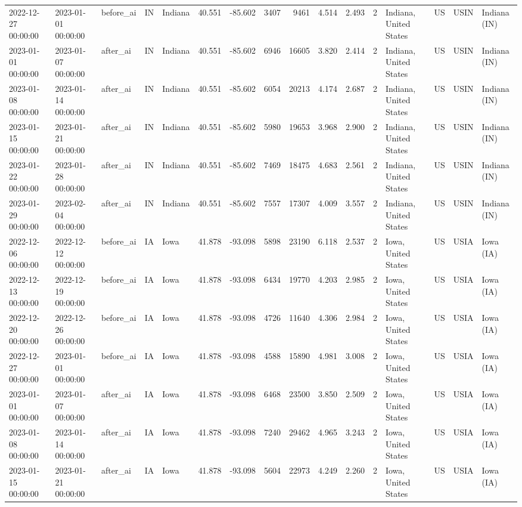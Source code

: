 \begin{tabular}{lllllrrrrrrlllll}
2022-12-27 00:00:00 & 2023-01-01 00:00:00 & before\_ai & IN & Indiana & 40.551 & -85.602 & 3407 & 9461 & 4.514 & 2.493 & 2 & Indiana, United States & US & USIN & Indiana (IN) \\
2023-01-01 00:00:00 & 2023-01-07 00:00:00 & after\_ai & IN & Indiana & 40.551 & -85.602 & 6946 & 16605 & 3.820 & 2.414 & 2 & Indiana, United States & US & USIN & Indiana (IN) \\
2023-01-08 00:00:00 & 2023-01-14 00:00:00 & after\_ai & IN & Indiana & 40.551 & -85.602 & 6054 & 20213 & 4.174 & 2.687 & 2 & Indiana, United States & US & USIN & Indiana (IN) \\
2023-01-15 00:00:00 & 2023-01-21 00:00:00 & after\_ai & IN & Indiana & 40.551 & -85.602 & 5980 & 19653 & 3.968 & 2.900 & 2 & Indiana, United States & US & USIN & Indiana (IN) \\
2023-01-22 00:00:00 & 2023-01-28 00:00:00 & after\_ai & IN & Indiana & 40.551 & -85.602 & 7469 & 18475 & 4.683 & 2.561 & 2 & Indiana, United States & US & USIN & Indiana (IN) \\
2023-01-29 00:00:00 & 2023-02-04 00:00:00 & after\_ai & IN & Indiana & 40.551 & -85.602 & 7557 & 17307 & 4.009 & 3.557 & 2 & Indiana, United States & US & USIN & Indiana (IN) \\
2022-12-06 00:00:00 & 2022-12-12 00:00:00 & before\_ai & IA & Iowa & 41.878 & -93.098 & 5898 & 23190 & 6.118 & 2.537 & 2 & Iowa, United States & US & USIA & Iowa (IA) \\
2022-12-13 00:00:00 & 2022-12-19 00:00:00 & before\_ai & IA & Iowa & 41.878 & -93.098 & 6434 & 19770 & 4.203 & 2.985 & 2 & Iowa, United States & US & USIA & Iowa (IA) \\
2022-12-20 00:00:00 & 2022-12-26 00:00:00 & before\_ai & IA & Iowa & 41.878 & -93.098 & 4726 & 11640 & 4.306 & 2.984 & 2 & Iowa, United States & US & USIA & Iowa (IA) \\
2022-12-27 00:00:00 & 2023-01-01 00:00:00 & before\_ai & IA & Iowa & 41.878 & -93.098 & 4588 & 15890 & 4.981 & 3.008 & 2 & Iowa, United States & US & USIA & Iowa (IA) \\
2023-01-01 00:00:00 & 2023-01-07 00:00:00 & after\_ai & IA & Iowa & 41.878 & -93.098 & 6468 & 23500 & 3.850 & 2.509 & 2 & Iowa, United States & US & USIA & Iowa (IA) \\
2023-01-08 00:00:00 & 2023-01-14 00:00:00 & after\_ai & IA & Iowa & 41.878 & -93.098 & 7240 & 29462 & 4.965 & 3.243 & 2 & Iowa, United States & US & USIA & Iowa (IA) \\
2023-01-15 00:00:00 & 2023-01-21 00:00:00 & after\_ai & IA & Iowa & 41.878 & -93.098 & 5604 & 22973 & 4.249 & 2.260 & 2 & Iowa, United States & US & USIA & Iowa (IA) \\

\end{tabular}
